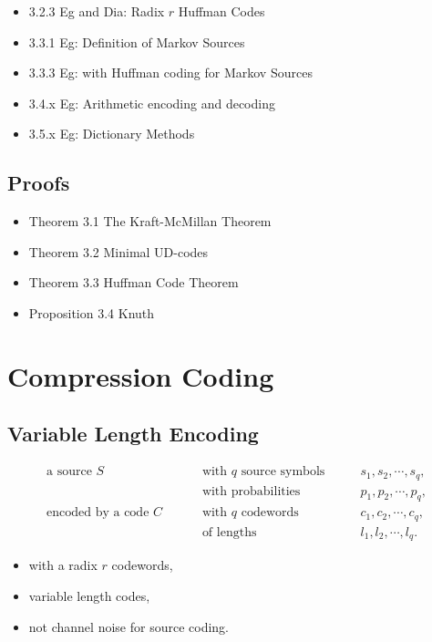 \documentclass{article}
\begin{document}
\begin{itemize}
    \item 3.2.3 Eg and Dia: Radix $r$ Huffman Codes
    \item 3.3.1 Eg: Definition of Markov Sources
    \item 3.3.3 Eg: with Huffman coding for Markov Sources
    \item 3.4.x Eg: Arithmetic encoding and decoding
    \item 3.5.x Eg: Dictionary Methods
\end{itemize}

\subsection{Proofs}

\begin{itemize}
    \item Theorem 3.1 The Kraft-McMillan Theorem
    \item Theorem 3.2 Minimal UD-codes
    \item Theorem 3.3 Huffman Code Theorem
    \item Proposition 3.4 Knuth
\end{itemize}

\newpage

\setcounter{section}{2}

\section{Compression Coding}

\subsection{Variable Length Encoding}

\begin{align*}
    \text{a source } S \qquad &\text{ with } q \text{ source symbols} \qquad & s_{1},s_{2},\cdots,s_{q},\\
    &\text{ with probabilities} \qquad &  p_{1},p_{2},\cdots,p_{q},\\
    \text{encoded by a code } C \qquad &\text{ with } q \text{ codewords} \qquad & c_{1},c_{2},\cdots,c_{q},\\
    &\text{ of lengths} \qquad & l_{1},l_{2},\cdots,l_{q}.
\end{align*}

\begin{itemize}
    \item with a radix $r$ codewords,
    \item variable length codes,
    \item not channel noise for source coding.
\end{itemize}
\end{document}
